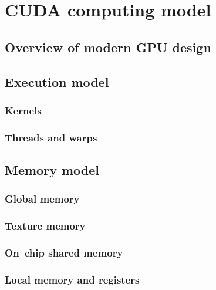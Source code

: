 \chapter{CUDA computing model}

\section{Overview of modern GPU design}

\section{Execution model}

\subsection{Kernels}

\subsection{Threads and warps}

\section{Memory model}

\subsection{Global memory}

\subsection{Texture memory}

\subsection{On--chip shared memory}

\subsection{Local memory and registers}